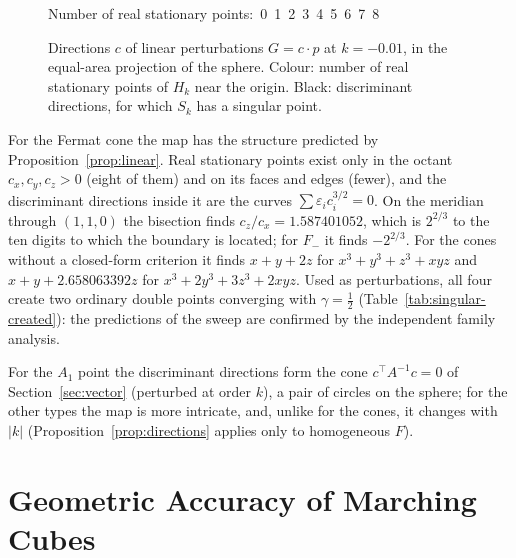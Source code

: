 \begin{figure}[!h]
\smallskip
{\footnotesize Number of real stationary points:\enspace
{}\,0\enspace
{}\,1\enspace
{}\,2\enspace
{}\,3\enspace
{}\,4\enspace
{}\,5\enspace
{}\,6\enspace
{}\,7\enspace
{}\,8}
\caption[Direction sweep]{Directions $c$ of linear perturbations $G=c\cdot p$
at $k=-0.01$, in the equal-area projection of the sphere. Colour: number of
real stationary points of $H_k$ near the origin. Black: discriminant
directions, for which $S_k$ has a singular point.}
\label{fig:sweep}
\end{figure}

For the Fermat cone the map has the structure predicted by
Proposition~\ref{prop:linear}. Real stationary points exist only in the octant
$c_x,c_y,c_z>0$ (eight of them) and on its faces and edges (fewer), and the
discriminant directions inside it are the curves
$\sum\varepsilon_i c_i^{3/2}=0$. On the meridian through $(1,1,0)$ the bisection
finds $c_z/c_x=1.587401052$, which is $2^{2/3}$ to the ten digits to which the
boundary is located; for $F_-$ it finds $-2^{2/3}$. For the cones without a
closed-form criterion it finds $x+y+2z$ for $x^3+y^3+z^3+xyz$ and
$x+y+2.658063392z$ for $x^3+2y^3+3z^3+2xyz$. Used as perturbations, all four
create two ordinary double points converging with $\gamma=\frac12$
(Table~\ref{tab:singular-created}): the predictions of the sweep are confirmed by
the independent family analysis.

For the $A_1$ point the discriminant directions form the cone
$c^{\top}A^{-1}c=0$ of Section~\ref{sec:vector} (perturbed at order $k$), a pair
of circles on the sphere; for the other types the map is more intricate, and,
unlike for the cones, it changes with $|k|$ (Proposition~\ref{prop:directions}
applies only to homogeneous $F$).

\section{Geometric Accuracy of Marching Cubes}
\label{sec:exp-accuracy}

